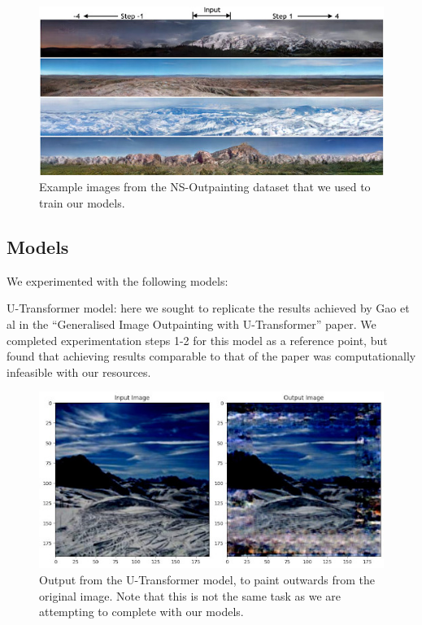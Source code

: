 \documentclass[sigconf]{acmart}
\begin{document}
\begin{figure}[h!]
    \centering
    \includegraphics[width=\linewidth]{ns_dataset}
    \caption{Example images from the NS-Outpainting dataset that we used to train our models.}
    \label{fig:ns_dataset}
\end{figure}

\subsection*{Models}

We experimented with the following models:

U-Transformer model: here we sought to replicate the results achieved by Gao et al in the “Generalised Image Outpainting with U-Transformer” paper. We completed experimentation steps 1-2 for this model as a reference point, but found that achieving results comparable to that of the paper was computationally infeasible with our resources.

\begin{figure}[h!]
    \centering
    \includegraphics[width=\linewidth]{u_transformer}
    \caption{Output from the U-Transformer model, to paint outwards from the original image. Note that this is not the same task as we are attempting to complete with our models.}
    \label{fig:u_transformer}
\end{figure}
\end{document}
